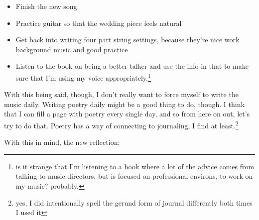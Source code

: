 \documentclass[12pt]{article}
\renewcommand{\,}{\textsuperscript{,}}
\begin{document}
\begin{itemize}

\item Finish the new song

\item Practice guitar so that the wedding piece feels natural

\item Get back into writing four part string settings, because they're nice work background music and good practice

\item Listen to the book on being a better talker and use the info in that to make sure that I'm using my voice appropriately.\footnote{is it strange that I'm listening to a book where a lot of the advice comes from talking to music directors, but is focused on professional environs, to work on my music? probably.}

\end{itemize}

With this being said, though, I don't really want to force myself to write the music daily.  
Writing poetry daily might be a good thing to do, though. I think that I can fill a page with poetry every single day, and so from here on out, let's try to do that.  
Poetry has a way of connecting to journaling, I find at least.\footnote{yes, I did intentionally spell the gerund form of journal differently both times I used it}

With this in mind, the new reflection:
\end{document}
